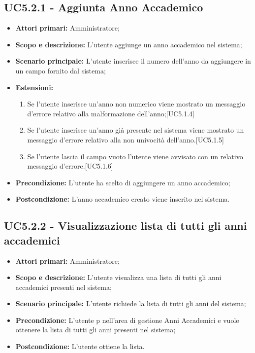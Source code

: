 \documentclass[AnalisiDeiRequisiti.tex]{subfiles}
\begin{document}
\subsection{UC5.2.1 - Aggiunta Anno Accademico}
\begin{itemize}
	\item \textbf{Attori primari:} Amministratore;
	\item \textbf{Scopo e descrizione:} L'utente aggiunge un anno accademico nel sistema;
	\item \textbf{Scenario principale:} L'utente inserisce il numero dell'anno da aggiungere in un campo fornito dal sistema;
	\item \textbf{Estensioni:}
	\begin{enumerate}
		\item Se l'utente inserisce un'anno non numerico viene mostrato un messaggio d'errore relativo alla malformazione dell'anno;[UC5.1.4]
		\item Se l'utente inserisce un'anno già presente nel sistema viene mostrato un messaggio d'errore relativo alla non univocità dell'anno.[UC5.1.5]
		\item Se l'utente lascia il campo vuoto l'utente viene avvisato con un relativo messaggio d'errore.[UC5.1.6]
	\end{enumerate}
	\item \textbf{Precondizione:} L'utente ha scelto di aggiungere un anno accademico; 
	\item \textbf{Postcondizione:} L'anno accademico creato viene inserito nel sistema.
\end{itemize}
\subsection{UC5.2.2 - Visualizzazione lista di tutti gli anni accademici}
\begin{itemize}
	\item \textbf{Attori primari:} Amministratore;
	\item \textbf{Scopo e descrizione:} L'utente visualizza una lista di tutti gli anni accademici presenti nel sistema;
	\item \textbf{Scenario principale:} L'utente richiede la lista di tutti gli anni del sistema;
	\item \textbf{Precondizione:} L'utente p nell'area di gestione Anni Accademici e vuole ottenere la lista di tutti gli anni presenti nel sistema; 
	\item \textbf{Postcondizione:} L'utente ottiene la lista.
\end{itemize}
\end{document}
